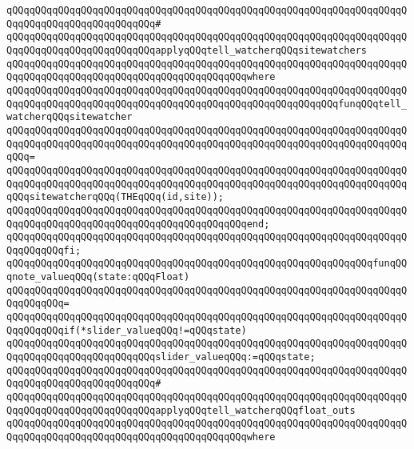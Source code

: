 \verb|qQQqqQQqqQQqqQQqqQQqqQQqqQQqqQQqqQQqqQQqqQQqqQQqqQQqqQQqqQQqqQQqqQQqqQQqqQQqqQQqqQQqqQQqqQQqqQQq#|\newline
\verb|qQQqqQQqqQQqqQQqqQQqqQQqqQQqqQQqqQQqqQQqqQQqqQQqqQQqqQQqqQQqqQQqqQQqqQQqqQQqqQQqqQQqqQQqqQQqqQQqapplyqQQqtell_watcherqQQqsitewatchers|\newline
\verb|qQQqqQQqqQQqqQQqqQQqqQQqqQQqqQQqqQQqqQQqqQQqqQQqqQQqqQQqqQQqqQQqqQQqqQQqqQQqqQQqqQQqqQQqqQQqqQQqqQQqqQQqqQQqqQQqwhere|\newline
\verb|qQQqqQQqqQQqqQQqqQQqqQQqqQQqqQQqqQQqqQQqqQQqqQQqqQQqqQQqqQQqqQQqqQQqqQQqqQQqqQQqqQQqqQQqqQQqqQQqqQQqqQQqqQQqqQQqqQQqqQQqqQQqqQQqfunqQQqtell_watcherqQQqsitewatcher|\newline
\verb|qQQqqQQqqQQqqQQqqQQqqQQqqQQqqQQqqQQqqQQqqQQqqQQqqQQqqQQqqQQqqQQqqQQqqQQqqQQqqQQqqQQqqQQqqQQqqQQqqQQqqQQqqQQqqQQqqQQqqQQqqQQqqQQqqQQqqQQqqQQqqQQq=|\newline
\verb|qQQqqQQqqQQqqQQqqQQqqQQqqQQqqQQqqQQqqQQqqQQqqQQqqQQqqQQqqQQqqQQqqQQqqQQqqQQqqQQqqQQqqQQqqQQqqQQqqQQqqQQqqQQqqQQqqQQqqQQqqQQqqQQqqQQqqQQqqQQqqQQqsitewatcherqQQq(THEqQQq(id,site));|\newline
\verb|qQQqqQQqqQQqqQQqqQQqqQQqqQQqqQQqqQQqqQQqqQQqqQQqqQQqqQQqqQQqqQQqqQQqqQQqqQQqqQQqqQQqqQQqqQQqqQQqqQQqqQQqqQQqqQQqend;|\newline
\verb|qQQqqQQqqQQqqQQqqQQqqQQqqQQqqQQqqQQqqQQqqQQqqQQqqQQqqQQqqQQqqQQqqQQqqQQqqQQqqQQqfi;|\newline
\newline
\verb|qQQqqQQqqQQqqQQqqQQqqQQqqQQqqQQqqQQqqQQqqQQqqQQqqQQqqQQqqQQqqQQqfunqQQqnote_valueqQQq(state:qQQqFloat)|\newline
\verb|qQQqqQQqqQQqqQQqqQQqqQQqqQQqqQQqqQQqqQQqqQQqqQQqqQQqqQQqqQQqqQQqqQQqqQQqqQQqqQQq=|\newline
\verb|qQQqqQQqqQQqqQQqqQQqqQQqqQQqqQQqqQQqqQQqqQQqqQQqqQQqqQQqqQQqqQQqqQQqqQQqqQQqqQQqif(*slider_valueqQQq!=qQQqstate)|\newline
\verb|qQQqqQQqqQQqqQQqqQQqqQQqqQQqqQQqqQQqqQQqqQQqqQQqqQQqqQQqqQQqqQQqqQQqqQQqqQQqqQQqqQQqqQQqqQQqqQQqslider_valueqQQq:=qQQqstate;|\newline
\verb|qQQqqQQqqQQqqQQqqQQqqQQqqQQqqQQqqQQqqQQqqQQqqQQqqQQqqQQqqQQqqQQqqQQqqQQqqQQqqQQqqQQqqQQqqQQqqQQq#|\newline
\verb|qQQqqQQqqQQqqQQqqQQqqQQqqQQqqQQqqQQqqQQqqQQqqQQqqQQqqQQqqQQqqQQqqQQqqQQqqQQqqQQqqQQqqQQqqQQqqQQqapplyqQQqtell_watcherqQQqfloat_outs|\newline
\verb|qQQqqQQqqQQqqQQqqQQqqQQqqQQqqQQqqQQqqQQqqQQqqQQqqQQqqQQqqQQqqQQqqQQqqQQqqQQqqQQqqQQqqQQqqQQqqQQqqQQqqQQqqQQqqQQqwhere|\newline
